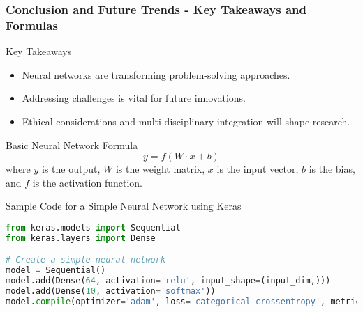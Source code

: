 \documentclass{beamer}
\begin{document}
\begin{frame}[fragile]
    \frametitle{Conclusion and Future Trends - Key Takeaways and Formulas}
    \begin{block}{Key Takeaways}
        \begin{itemize}
            \item Neural networks are transforming problem-solving approaches.
            \item Addressing challenges is vital for future innovations.
            \item Ethical considerations and multi-disciplinary integration will shape research.
        \end{itemize}
    \end{block}

    \begin{block}{Basic Neural Network Formula}
        \begin{equation}
        y = f(W \cdot x + b)
        \end{equation}
        where \(y\) is the output, \(W\) is the weight matrix, \(x\) is the input vector, \(b\) is the bias, and \(f\) is the activation function.
    \end{block}

    \begin{block}{Sample Code for a Simple Neural Network using Keras}
        \begin{lstlisting}[language=Python]
from keras.models import Sequential
from keras.layers import Dense

# Create a simple neural network
model = Sequential()
model.add(Dense(64, activation='relu', input_shape=(input_dim,)))
model.add(Dense(10, activation='softmax'))
model.compile(optimizer='adam', loss='categorical_crossentropy', metrics=['accuracy'])
        \end{lstlisting}
    \end{block}
\end{frame}
\end{document}
